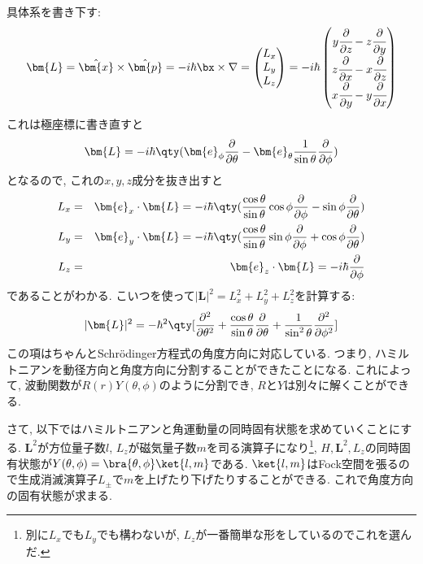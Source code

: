 \documentclass[10.5pt,a4paper]{jreport}
\begin{document}
具体系を書き下す:
\begin{eqnarray}
  \bm{L} =\hat{\bm{x}}\times\hat{\bm{p}} = -i\hbar\bx\times\nabla =
  \begin{pmatrix}
    L_x\\
    L_y\\
    L_z
  \end{pmatrix}
  = -i\hbar
  \begin{pmatrix}
    y\cfrac{\partial}{\partial z} - z\cfrac{\partial}{\partial y}\\
    z\cfrac{\partial}{\partial x} - x\cfrac{\partial}{\partial z}\\
    x\cfrac{\partial}{\partial y} - y\cfrac{\partial}{\partial x}
  \end{pmatrix}
\end{eqnarray}
これは極座標に書き直すと
\begin{eqnarray}
  \bm{L} = -i\hbar\qty(\bm{e}_\phi\frac{\partial}{\partial \theta} - \bm{e}_\theta\frac{1}{\sin{\theta}}\frac{\partial}{\partial\phi})
\end{eqnarray}
となるので, これの$x, y, z$成分を抜き出すと
\begin{eqnarray}
  L_x &=& \bm{e}_x\cdot\bm{L} = -i\hbar\qty(\frac{\cos{\theta}}{\sin{\theta}}\cos{\phi}\frac{\partial}{\partial\phi} - \sin{\phi}\frac{\partial}{\partial\theta})\\
  L_y &=& \bm{e}_y\cdot\bm{L} = -i\hbar\qty(\frac{\cos{\theta}}{\sin{\theta}}\sin{\phi}\frac{\partial}{\partial\phi} + \cos{\phi}\frac{\partial}{\partial\theta})\\
  L_z &=& \bm{e}_z\cdot\bm{L} = -i\hbar\frac{\partial}{\partial\phi}
\end{eqnarray}
であることがわかる. こいつを使って$|\bm{L}|^2 = L_x^2 + L_y^2 + L_z^2$を計算する:
\begin{eqnarray}
  |\bm{L}|^2 = -\hbar^2\qty[\frac{\partial^2}{\partial\theta^2} + \frac{\cos{\theta}}{\sin{\theta}}\frac{\partial}{\partial\theta} + \frac{1}{\sin^2{\theta}}\frac{\partial^2}{\partial\phi^2}]
\end{eqnarray}
この項はちゃんとSchr\"odinger方程式の角度方向に対応している. つまり, ハミルトニアンを動径方向と角度方向に分割することができたことになる. これによって, 波動関数が$R(r)Y(\theta, \phi)$のように分割でき, $R$と$Y$は別々に解くことができる.

さて, 以下ではハミルトニアンと角運動量の同時固有状態を求めていくことにする. $\bm{L}^2$が方位量子数$l$, $L_z$が磁気量子数$m$を司る演算子になり\footnote{別に$L_x$でも$L_y$でも構わないが, $L_z$が一番簡単な形をしているのでこれを選んだ. }, $H, \bm{L}^2, L_z$の同時固有状態が$Y(\theta, \phi) = \bra{\theta, \phi}\ket{l, m}$である. $\ket{l, m}$はFock空間を張るので生成消滅演算子$L_{\pm}$で$m$を上げたり下げたりすることができる. これで角度方向の固有状態が求まる.
\end{document}

